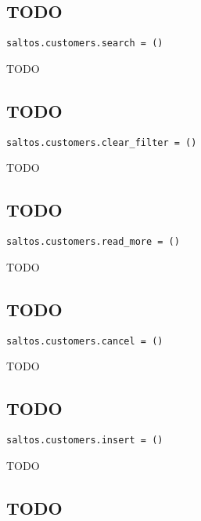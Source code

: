 \documentclass[a4paper]{book}
\begin{document}
\hypertarget{toc509}{}
\subsection{TODO}

\begin{lstlisting}
saltos.customers.search = ()
\end{lstlisting}

TODO

\hypertarget{toc510}{}
\subsection{TODO}

\begin{lstlisting}
saltos.customers.clear_filter = ()
\end{lstlisting}

TODO

\hypertarget{toc511}{}
\subsection{TODO}

\begin{lstlisting}
saltos.customers.read_more = ()
\end{lstlisting}

TODO

\hypertarget{toc512}{}
\subsection{TODO}

\begin{lstlisting}
saltos.customers.cancel = ()
\end{lstlisting}

TODO

\hypertarget{toc513}{}
\subsection{TODO}

\begin{lstlisting}
saltos.customers.insert = ()
\end{lstlisting}

TODO

\hypertarget{toc514}{}
\subsection{TODO}
\end{document}

